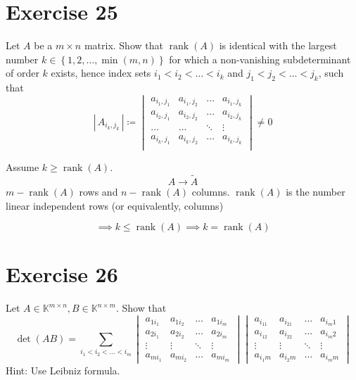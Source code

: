 \documentclass[a4paper]{article}
\theoremstyle{definition}
\newcommand\set[1]{\left\{#1\right\}}
\newcommand\card[1]{\left|\,#1\,\right|}
\DeclareMathOperator\rank{rank}
\begin{document}
\section{Exercise 25}
\begin{ex}
  Let $A$ be a $m \times n$ matrix. Show that $\rank(A)$ is identical with the largest number $k \in \set{1,2,\ldots,\min(m,n)}$ for which a non-vanishing subdeterminant of order $k$ exists, hence
  index sets $i_1 < i_2 < \ldots < i_k$ and $j_1 < j_2 < \ldots < j_k$, such that
  \[
    \card{A_{i_k,j_k}} \coloneqq
    \begin{vmatrix}
      a_{i_1,j_1} & a_{i_1,j_2} & \ldots & a_{i_1,j_k} \\
      a_{i_2,j_1} & a_{i_2,j_2} & \ldots & a_{i_2,j_k} \\
      \ldots      & \ldots      & \ddots & \vdots      \\
      a_{i_k,j_1} & a_{i_k,j_2} & \ldots & a_{i_k,j_k} \\
    \end{vmatrix}
    \neq 0
  \]
\end{ex}

Assume $k \geq \rank(A)$.
\[ A \to \tilde A \]
$m - \rank(A)$ rows and $n - \rank(A)$ columns.
$\rank(A)$ is the number linear independent rows (or equivalently, columns)

\[ \implies k \leq \rank(A) \implies k = \rank(A) \]

\section{Exercise 26}
\begin{ex}
  Let $A \in \mathbb K^{m\times n}, B \in \mathbb K^{n \times m}$. Show that
  \[
    \det(AB) = \sum_{i_1 < i_2 < \ldots < i_m}
    \begin{vmatrix}
      a_{1i_1} & a_{1i_2} & \ldots & a_{1i_m} \\
      a_{2i_1} & a_{2i_2} & \ldots & a_{2i_m} \\
      \vdots & \vdots & \ddots & \vdots \\
      a_{mi_1} & a_{mi_2} & \ldots & a_{mi_m}
    \end{vmatrix}
    \begin{vmatrix}
      a_{i_11} & a_{i_21} & \ldots & a_{i_m1} \\
      a_{i_12} & a_{i_22} & \ldots & a_{i_m2} \\
      \vdots & \vdots & \ddots & \vdots \\
      a_{i_1m} & a_{i_2m} & \ldots & a_{i_mm}
    \end{vmatrix}
  \]
  Hint: Use Leibniz formula.
\end{ex}
\end{document}

